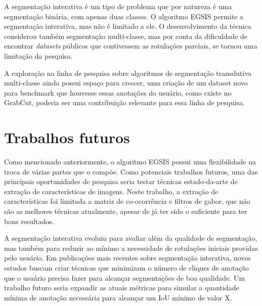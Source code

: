 A segmentação interativa é um tipo de problema que por natureza é uma
segmentação binária, com apenas duas classes. O algoritmo \gls{EGSIS}
permite a segmentação interativa, mas não é limitado a ele. O
desenvolvimento da técnica considerou também segmentação multi-classe,
mas por conta da dificuldade de encontrar \textit{datasets} públicos
que contivessem as rotulações parciais, se tornou uma limitação da
pesquisa.

A exploração na linha de pesquisa sobre algoritmos de segmentação
transdutiva multi-classe ainda possui espaço para crescer, uma criação
de um dataset novo para benchmark que houvesse essas anotações do
usuário, como existe no GrabCut, poderia ser uma contribuição
relevante para essa linha de pesquisa.


\section{Trabalhos futuros}\label{sec:trabalhos-futuros}

Como mencionado anteriormente, o algoritmo \gls{EGSIS} possui uma
flexibilidade na troca de várias partes que o compõe. Como potenciais
trabalhos futuros, uma das principais oportunidades de pesquisa seria
testar técnicas estado-da-arte de extração de características de
imagens. Neste trabalho, a extração de características foi limitada a
matriz de co-ocorrência e filtros de gabor, que não são as melhores
técnicas atualmente, apesar de já ter sido o suficiente para ter bons
resultados.

A segmentação interativa evoluiu para avaliar além da qualidade de
segmentação, mas também para reduzir ao mínimo a necessidade de
rotulações iniciais providas pelo usuário. Em publicações mais
recentes sobre segmentação interativa, novos estudos buscam criar
técnicas que minimizam o número de cliques de anotação que o usuário
precisa fazer para alcançar segmentações de boa qualidade. Um trabalho
futuro seria expandir as atuais métricas para simular a quantidade
mínima de anotação necessária para alcançar um IoU mínimo de valor X.
